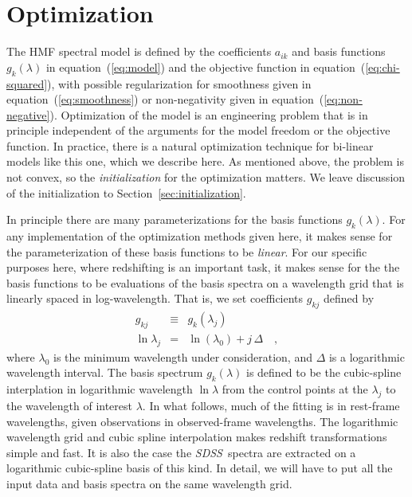 \documentclass[12pt,preprint]{aastex}
\newcommand{\project}[1]{\textsl{#1}}
\newcommand{\sdss}{\project{SDSS}}
\newcommand{\sectionname}{Section}
\newcommand{\equationname}{equation}
\begin{document}
\section{Optimization}\label{sec:optimization}

The HMF spectral model is defined by the coefficients $a_{ik}$ and basis
functions $g_k(\lambda)$ in \equationname~(\ref{eq:model}) and the
objective function in \equationname~(\ref{eq:chi-squared}), with possible
regularization for smoothness given in
\equationname~(\ref{eq:smoothness}) or non-negativity given in
\equationname~(\ref{eq:non-negative}).  Optimization of the model is an
engineering problem that is in principle independent of the arguments
for the model freedom or the objective function.  In practice, there
is a natural optimization technique for bi-linear models like this
one, which we describe here.  As mentioned above, the problem is not
convex, so the \emph{initialization} for the optimization matters.  We
leave discussion of the initialization to
\sectionname~\ref{sec:initialization}.

In principle there are many parameterizations for the basis functions
$g_k(\lambda)$.  For any implementation of the optimization methods
given here, it makes sense for the parameterization of these basis
functions to be \emph{linear}.  For our specific purposes here, where
redshifting is an important task, it makes sense for the the basis
functions to be evaluations of the basis spectra on a wavelength grid
that is linearly spaced in log-wavelength.  That is, we set
coefficients $g_{kj}$ defined by
\begin{eqnarray}\displaystyle
g_{kj} & \equiv & g_k(\lambda_j) \nonumber\\
\ln\lambda_j & = & \ln(\lambda_0) + j\,\Delta
\quad ,
\end{eqnarray}
where $\lambda_0$ is the minimum wavelength under consideration, and
$\Delta$ is a logarithmic wavelength interval.  The basis spectrum
$g_k(\lambda)$ is defined to be the cubic-spline interplation in
logarithmic wavelength $\ln\lambda$ from the control points at the
$\lambda_j$ to the wavelength of interest $\lambda$.  In what follows,
much of the fitting is in rest-frame wavelengths, given observations
in observed-frame wavelengths.  The logarithmic wavelength grid and
cubic spline interpolation makes redshift transformations simple and
fast.  It is also the case the \sdss\ spectra are extracted on a
logarithmic cubic-spline basis of this kind.  In detail, we will have
to put all the input data and basis spectra on the same wavelength
grid.
\end{document}
